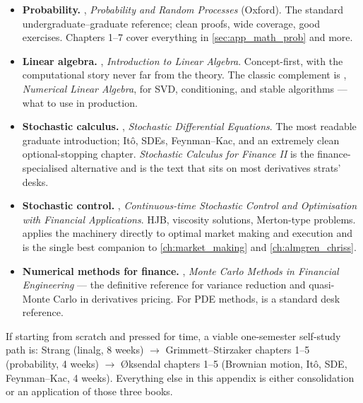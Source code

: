 \begin{itemize}
  \item \textbf{Probability.} \citet{grimmett2001probability},
        \emph{Probability and Random Processes} (Oxford). The standard
        undergraduate--graduate reference; clean proofs, wide coverage,
        good exercises. Chapters 1--7 cover everything in
        \cref{sec:app_math_prob} and more.
  \item \textbf{Linear algebra.} \citet{strang2016linalg},
        \emph{Introduction to Linear Algebra}. Concept-first, with the
        computational story never far from the theory. The classic
        complement is \citet{trefethen1997numerical},
        \emph{Numerical Linear Algebra}, for SVD, conditioning, and
        stable algorithms --- what to use in production.
  \item \textbf{Stochastic calculus.} \citet{oksendal2003stochastic},
        \emph{Stochastic Differential Equations}. The most readable
        graduate introduction; It\^o, SDEs, Feynman--Kac, and an
        extremely clean optional-stopping chapter.
        \citet{shreve2004stochastic} \emph{Stochastic Calculus for
        Finance II} is the finance-specialised alternative and is the
        text that sits on most derivatives strats' desks.
  \item \textbf{Stochastic control.} \citet{pham2009continuous},
        \emph{Continuous-time Stochastic Control and Optimisation with
        Financial Applications}. HJB, viscosity solutions, Merton-type
        problems. \citet{cartea2015algorithmic} applies the machinery
        directly to optimal market making and execution and is the
        single best companion to \cref{ch:market_making} and
        \cref{ch:almgren_chriss}.
  \item \textbf{Numerical methods for finance.}
        \citet{glasserman2004monte}, \emph{Monte Carlo Methods in
        Financial Engineering} --- the definitive reference for
        variance reduction and quasi-Monte Carlo in derivatives
        pricing. For PDE methods, \citet{duffy2006finite} is a
        standard desk reference.
\end{itemize}

\begin{keyfactbox}
If starting from scratch and pressed for time, a viable one-semester
self-study path is: Strang (linalg, 8 weeks) $\to$ Grimmett--Stirzaker
chapters 1--5 (probability, 4 weeks) $\to$ \O ksendal chapters 1--5
(Brownian motion, It\^o, SDE, Feynman--Kac, 4 weeks). Everything else
in this appendix is either consolidation or an application of those
three books.
\end{keyfactbox}
